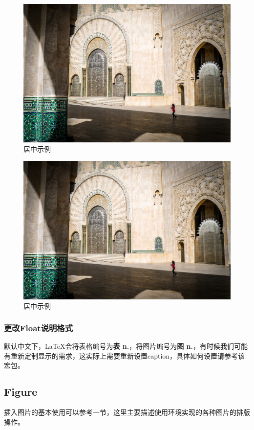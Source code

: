     \begin{texsepcode}
        \begin{texcodenoshad}
            \begin{figure}[H]
                \centering
                \includegraphics[width=0.5\columnwidth]{contents/fig/mosque.jpg}
                \caption{居中示例}
            \end{figure}
        \end{texcodenoshad}
        \tcblower
        \begin{figure}[H]
            \centering
            \includegraphics[width=0.5\columnwidth]{contents/fig/mosque.jpg}
            \caption{居中示例}
        \end{figure}
    \end{texsepcode}
    \subsubsection{更改Float说明格式}
    默认中文下，\LaTeX{}会将表格编号为\textbf{表 n.}，将图片编号为\textbf{图 n.}，有时候我们可能有重新定制显示的需求，这实际上需要重新设置caption，具体如何设置请参考该宏包。




    \subsection{Figure}\label{sub:figure}
    插入图片的基本使用可以参考一节，这里主要描述使用环境实现的各种图片的排版操作。

